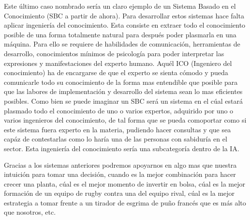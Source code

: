 \documentclass[11pt,a4paper,twoside,final]{article}
\begin{document}
\smallskip
Este último caso nombrado sería un claro ejemplo de un Sistema Basado en el Conocimiento (SBC a partir de ahora). Para desarrollar estos sistemas hace falta aplicar ingeniería del conocimiento.
Esta consiste en extraer todo el conocimiento posible de una forma totalmente natural para después poder plasmarla en una máquina. Para ello se requiere de habilidades
 de comunicación, herramientas de desarrollo, conocimientos mínimos de psicología para poder interpretar las expresiones y manifestaciones del experto humano. Aquél ICO (Ingeniero del conocimiento)
 ha de encargarse de que el experto se sienta cómodo y pueda comunicarle todo su conocimiento de la forma mas entendible que posible para que las labores de implementación
 y desarrollo del sistema sean lo mas eficientes posibles. Como bien se puede imaginar un SBC será un sistema
 en el cúal estará plasmado todo el conocimiento de uno o varios expertos, adquirido por uno o varios ingenieros del conocimiento, de tal forma que se pueda comoportar
 como si este sistema fuera experto en la materia, pudiendo hacer consultas y que sea capáz de contestarlas como lo haría una de las personas con sabiduría en el sector.
 Esta ingeniería del conocimiento sería una subcategoría dentro de la IA.

\smallskip
Gracias a los sistemas anteriores podremos apoyarnos en algo mas que nuestra intuición para tomar una decisión, cuando es la mejor combinación para hacer crecer una planta,
 cúal es el mejor momento de invertir en bolsa, cúal es la mejor formación de un equipo de rugby contra una del equipo rival, cúal es la mejor estrategia a tomar frente a un tirador de esgrima
 de puño francés que es más alto que nosotros, etc.
\end{document}
